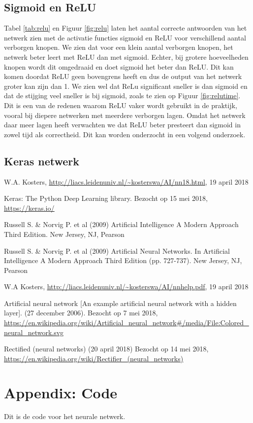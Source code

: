 \documentclass[10pt]{article}
\begin{document}
\subsection{Sigmoid en ReLU}
Tabel \ref{tab:relu} en Figuur \ref{fig:relu} laten het aantal correcte antwoorden van het netwerk zien met de activatie functies sigmoid en ReLU voor verschillend aantal verborgen knopen. We zien dat voor een klein aantal verborgen knopen, het netwerk beter leert met ReLU dan met sigmoid. Echter, bij grotere hoeveelheden knopen wordt dit omgedraaid en doet sigmoid het beter dan ReLU. Dit kan komen doordat ReLU geen bovengrens heeft en dus de output van het netwerk groter kan zijn dan 1. We zien wel dat ReLu significant sneller is dan sigmoid en dat de stijging veel sneller is bij sigmoid, zoals te zien op Figuur \ref{fig:relutime}.
Dit is een van de redenen waarom ReLU vaker wordt gebruikt in de praktijk, vooral bij diepere netwerken met meerdere verborgen lagen. Omdat het netwerk daar meer lagen heeft verwachten we dat ReLU beter presteert dan sigmoid in zowel tijd als correctheid. Dit kan worden onderzocht in een volgend onderzoek.

\subsection{Keras netwerk}

\clearpage

\begin{thebibliography}{XX}

W.A. Kosters, \href{http://liacs.leidenuniv.nl/~kosterswa/AI/nn18.html}{\underline{http://liacs.leidenuniv.nl/\textasciitilde{}kosterswa/AI/nn18.html}}, 19 april 2018

Keras: The Python Deep Learning library. Bezocht op 15 mei 2018, \href{https://keras.io/}{\underline{https://keras.io/}}

Russell S. \& Norvig P. et al (2009) Artificial Intelligence A Modern Approach Third Edition. New Jersey, NJ, Pearson

Russell S. \& Norvig P. et al (2009) Artificial Neural Networks. In Artificial Intelligence A Modern Approach Third Edition (pp. 727-737). New Jersey, NJ, Pearson

W.A Kosters, \href{http://liacs.leidenuniv.nl/\textasciitilde{}kosterswa/AI/nnhelp.pdf}{\underline{http://liacs.leidenuniv.nl/\textasciitilde{}kosterswa/AI/nnhelp.pdf}}, 19 april 2018

Artificial neural network [An example artificial neural network with a hidden layer]. (27 december 2006).
Bezocht op 7 mei 2018, 
\href{https://en.wikipedia.org/wiki/Artificial_neural_network#/media/File:Colored_neural_network.svg}{\underline{https://en.wikipedia.org/wiki/Artificial\_neural\_network\#/media/File:Colored\_neural\_network.svg}}

 Rectified (neural networks) (20 april 2018) Bezocht op 14 mei 2018, \href{https://en.wikipedia.org/wiki/Rectifier_(neural_networks)}{\underline{https://en.wikipedia.org/wiki/Rectifier\_(neural\_networks)}}


\end{thebibliography}


\section*{Appendix: Code}
Dit is de code voor het neurale netwerk.
% 
\end{document}
